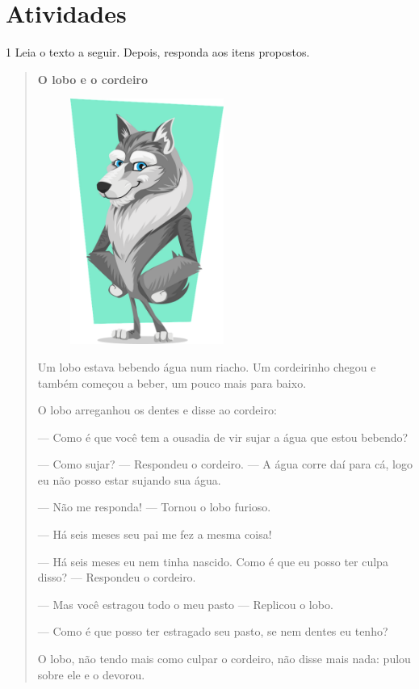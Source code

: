 \section{Atividades}

\num{1} Leia o texto a seguir. Depois, responda aos itens propostos.


\begin{quote}
\textbf{O lobo e o cordeiro}

\begin{figure}
\includegraphics[width=1.97917in,height=3.16667in]{./media/image5.png}
\end{figure}

Um lobo estava bebendo água num riacho. Um cordeirinho chegou e também
começou a beber, um pouco mais para baixo.

O lobo arreganhou os dentes e disse ao cordeiro:

--- Como é que você tem a ousadia de vir sujar a água que estou bebendo?

--- Como sujar? --- Respondeu o cordeiro. --- A água corre daí para cá,
logo eu não posso estar sujando sua água.

--- Não me responda! --- Tornou o lobo furioso.

--- Há seis meses seu pai me fez a mesma coisa!

--- Há seis meses eu nem tinha nascido. Como é que eu posso ter culpa
disso? --- Respondeu o cordeiro.

--- Mas você estragou todo o meu pasto --- Replicou o lobo.

--- Como é que posso ter estragado seu pasto, se nem dentes eu tenho?

O lobo, não tendo mais como culpar o cordeiro, não disse mais nada:
pulou sobre ele e o devorou.

\end{quote}

